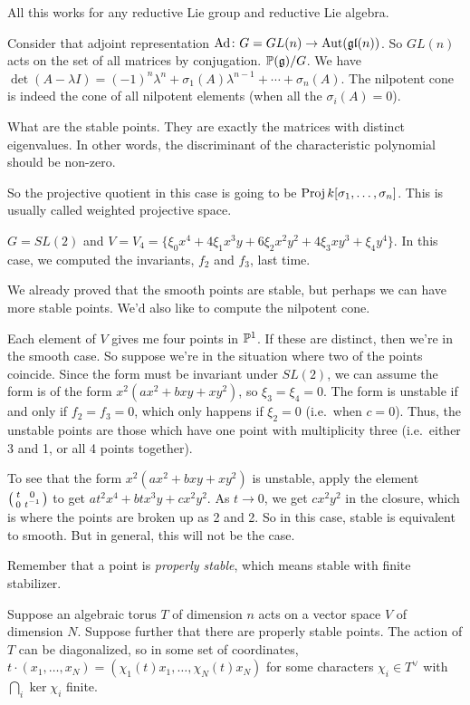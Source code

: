 \begin{example}
 All this works for any reductive Lie group and reductive Lie algebra.

 Consider that adjoint representation $\mathrm{Ad}\colon G=GL(n)\to \operatorname{Aut}(\mathfrak{gl}(n))$. So $GL(n)$ acts on the set of all matrices by conjugation. $\mathbb{P}(\mathfrak{g})/G$. We have $\det(A-\lambda I)=(-1)^n \lambda^n + \sigma_1(A)\lambda^{n-1}+\cdots +\sigma_n(A)$. The nilpotent cone is indeed the cone of all nilpotent elements (when all the $\sigma_i(A)=0$).
 
 What are the stable points. They are exactly the matrices with distinct eigenvalues. In other words, the discriminant of the characteristic polynomial should be non-zero.
 
 So the projective quotient in this case is going to be $\operatorname{Proj} k[\sigma_1,\dots, \sigma_n]$. This is usually called weighted projective space. 
\end{example}
\begin{example}
 $G=SL(2)$ and $V=V_4=\{\xi_0x^4+4\xi_1 x^3y+6\xi_2x^2y^2+4\xi_3 xy^3+\xi_4y^4\}$. In this case, we computed the invariants, $f_2$ and $f_3$, last time.
 
 We already proved that the smooth points are stable, but perhaps we can have more stable points. We'd also like to compute the nilpotent cone.
 
 Each element of $V$ gives me four points in $\mathbb{P}^1$. If these are distinct, then we're in the smooth case. So suppose we're in the situation where two of the points coincide. Since the form must be invariant under $SL(2)$, we can assume the form is of the form $x^2(ax^2+bxy+xy^2)$, so $\xi_3=\xi_4=0$. The form is unstable if and only if $f_2=f_3=0$, which only happens if $\xi_2=0$ (i.e.~when $c=0$). Thus, the unstable points are those which have one point with multiplicity three (i.e.~either 3 and 1, or all 4 points together).
 
 To see that the form $x^2(ax^2+bxy+xy^2)$ is unstable, apply the element $\bigl(\begin{smallmatrix} t&0\\ 0&t^{-1} \end{smallmatrix}\bigr)$ to get $at^2x^4+btx^3y+cx^2y^2$. As $t\to 0$, we get $cx^2y^2$ in the closure, which is where the points are broken up as 2 and 2. So in this case, stable is equivalent to smooth. But in general, this will not be the case.
\end{example}
Remember that a point is \emph{properly stable}, which means stable with finite stabilizer.

Suppose an algebraic torus $T$ of dimension $n$ acts on a vector space $V$ of dimension $N$. Suppose further that there are properly stable points. The action of $T$ can be diagonalized, so in some set of coordinates, $t\cdot (x_1,\dots, x_N)=(\chi_1(t)x_1,\dots, \chi_N(t)x_N)$ for some characters $\chi_i\in T^\vee$ with $\bigcap_i \ker \chi_i$ finite.

